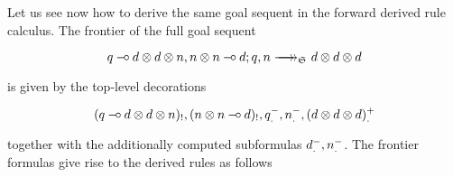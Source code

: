 \begin{example}
Let us see now how to derive the same goal sequent in the forward derived rule
calculus. The frontier of the full goal sequent

\[
  \zfneuseq{q \limp d\otimes d\otimes n, n \otimes n \limp d}{q,n}{\ctrlset{}}
  {d \otimes d \otimes d}
\]

is given by the top-level decorations

\[
  (q \mathbin{{-}\mkern-3.5mu{\circ}} d \otimes d \otimes n)_!,
  (n \otimes n \mathbin{{-}\mkern-3.5mu{\circ}} d)_!,
  q_.^-, n_.^-,
  (d \otimes d \otimes d)_.^+
\]

together with the additionally computed subformulas
$d_.^-, n_.^-$. The frontier
formulas give rise to the derived rules as follows

\end{example}
